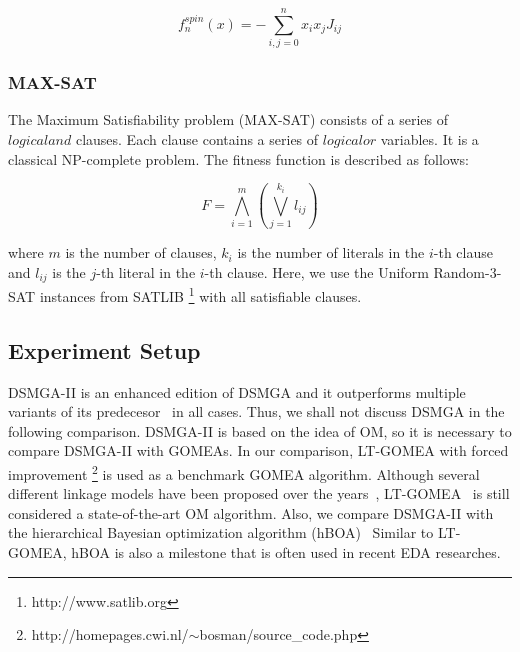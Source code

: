 \documentclass{sig-alternate-05-2015}
\begin{document}
\begin{displaymath}
f_{n}^{spin}(x) = -\sum_{i,j=0}^{n} x_{i}x_{j}J_{ij}
\end{displaymath}


\subsubsection{MAX-SAT}
The Maximum Satisfiability problem (MAX-SAT) consists of a series of $logical and$ clauses. Each clause contains a series of $logical or$ variables. It is a classical NP-complete problem. The fitness function is described as follows:  

\begin{displaymath}
F = \bigwedge_{i=1}^{m} \left (\bigvee_{j=1}^{k_{i}} l_{ij} \right )
\end{displaymath}

where $m$ is the number of clauses, $k_i$ is the number of literals in the $i$-th clause and $l_{ij}$ is the $j$-th literal in the $i$-th clause. Here, we use the Uniform Random-3-SAT instances from SATLIB \footnote{http://www.satlib.org} with all satisfiable clauses.  


\subsection{Experiment Setup}
DSMGA-II is an enhanced edition of DSMGA and it outperforms multiple variants of its predecesor~\cite{yu:DSMGA} in all cases. 
Thus, we shall not discuss DSMGA in the following comparison.
DSMGA-II is based on the idea of OM, so it is necessary to compare DSMGA-II with GOMEAs. 
In our comparison, LT-GOMEA with forced improvement \footnote{http://homepages.cwi.nl/$\sim$bosman/source\_code.php} is used as a benchmark GOMEA algorithm.
Although several different linkage models have been proposed over the years~\cite{bosman:robust}, LT-GOMEA~\cite{bosman:LT-GOMEA} is still considered a state-of-the-art OM algorithm.
Also, we compare DSMGA-II with the hierarchical Bayesian optimization algorithm (hBOA)~\cite{pelikan:hBOA}
Similar to LT-GOMEA, hBOA is also a milestone that is often used in recent EDA researches.
\end{document}
